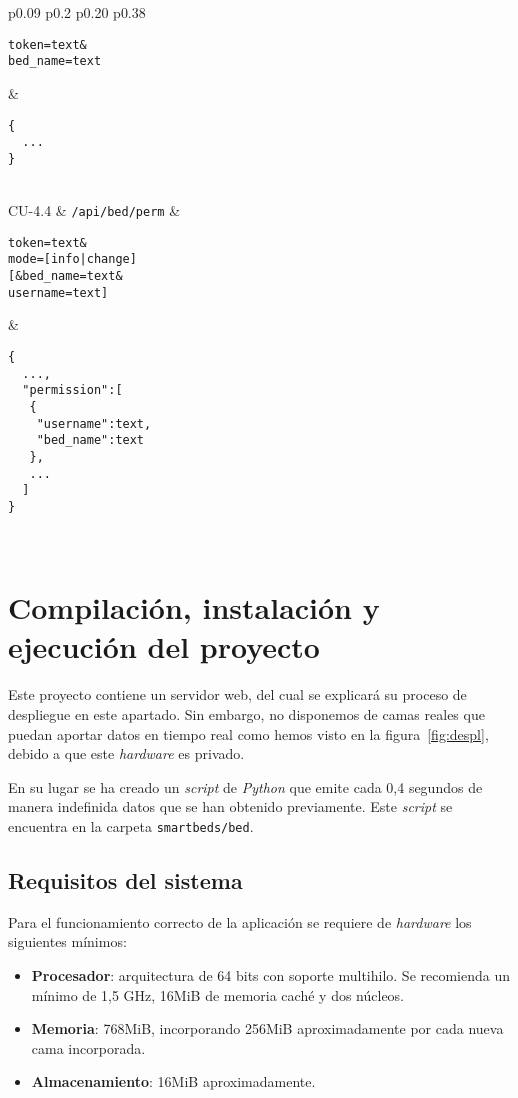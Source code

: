 \begin{center}
\begin{xtabular}{p{0.09\textwidth} p{0.2\textwidth} p{0.20\textwidth} p{0.38\textwidth}}
\begin{lstlisting}[language=JSONT]
token=text&
bed_name=text
\end{lstlisting}
&
\begin{lstlisting}[language=JSONT]
{
  ...
}\end{lstlisting}
\\\hubu
CU-4.4		&	\texttt{/api/bed/perm}	& 
\begin{lstlisting}[language=JSONT]
token=text&
mode=[info|change]
[&bed_name=text&
username=text]
\end{lstlisting}
&
\begin{lstlisting}[language=JSONT]
{
  ...,
  "permission":[
   {
    "username":text,
    "bed_name":text
   },
   ...
  ]
}\end{lstlisting}
\\\bottomrule
	\end{xtabular}
	\label{tabla:api-specs2}
\end{center}

\section{Compilación, instalación y ejecución del proyecto}

Este proyecto contiene un servidor web, del cual se explicará su proceso de despliegue en este apartado. Sin embargo, no disponemos de camas reales que puedan aportar datos en tiempo real como hemos visto en la figura~\ref{fig:despl}, debido a que este \textit{hardware} es privado.

En su lugar se ha creado un \textit{script} de \textit{Python} que emite cada 0,4 segundos de manera indefinida datos que se han obtenido previamente. Este \textit{script} se encuentra en la carpeta \texttt{smartbeds/bed}.


\subsection{Requisitos del sistema}

Para el funcionamiento correcto de la aplicación se requiere de \textit{hardware} los siguientes mínimos:

\begin{itemize}
	\item \textbf{Procesador}: arquitectura de 64 bits con soporte multihilo. Se recomienda un mínimo de 1,5 GHz, 16MiB de memoria caché y dos núcleos.
	\item \textbf{Memoria}: 768MiB, incorporando 256MiB aproximadamente por cada nueva cama incorporada. 
	\item \textbf{Almacenamiento}: 16MiB aproximadamente.
\end{itemize}

